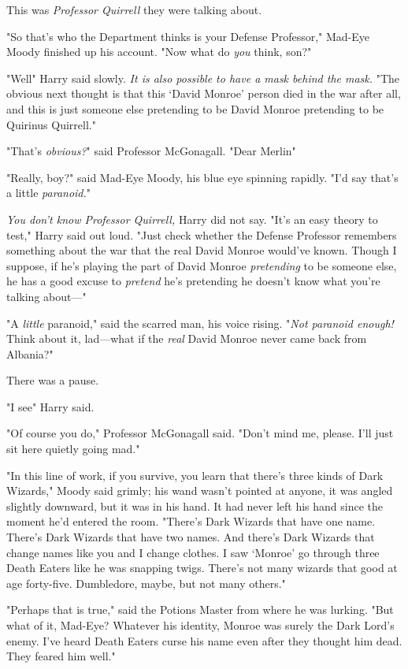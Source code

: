 This was \emph{Professor Quirrell} they were talking about.

"So that's who the Department thinks is your Defense Professor," Mad-Eye Moody
finished up his account. "Now what do \emph{you} think, son?"

"Well{\el}" Harry said slowly. \emph{It is also possible to have a mask
behind the mask.} "The obvious next thought is that this `David Monroe' person
died in the war after all, and this is just someone else pretending to be David
Monroe pretending to be Quirinus Quirrell."

"That's \emph{obvious?}" said Professor McGonagall. "Dear Merlin{\el}"

"Really, boy?" said Mad-Eye Moody, his blue eye spinning rapidly. "I'd say
that's a little{\el} \emph{paranoid.}"

\emph{You don't know Professor Quirrell,} Harry did not say. "It's an easy
theory to test," Harry said out loud. "Just check whether the Defense Professor
remembers something about the war that the real David Monroe would've known.
Though I suppose, if he's playing the part of David Monroe \emph{pretending} to
be someone else, he has a good excuse to \emph{pretend} he's pretending he
doesn't know what you're talking about\mbox{---}"

"A \emph{little} paranoid," said the scarred man, his voice rising. "\emph{Not
paranoid enough! } Think about it, lad---what if the
\emph{real} David Monroe never came back from Albania?"

There was a pause.

"I see{\el}" Harry said.

"Of course you do," Professor McGonagall said. "Don't mind me, please. I'll
just sit here quietly going mad."

"In this line of work, if you survive, you learn that there's three kinds of
Dark Wizards," Moody said grimly; his wand wasn't pointed at anyone, it was
angled slightly downward, but it was in his hand. It had never left his hand
since the moment he'd entered the room. "There's Dark Wizards that have one
name. There's Dark Wizards that have two names. And there's Dark Wizards that
change names like you and I change clothes. I saw `Monroe' go through three
Death Eaters like he was snapping twigs. There's not many wizards that good at
age forty-five. Dumbledore, maybe, but not many others."

"Perhaps that is true," said the Potions Master from where he was lurking. "But
what of it, Mad-Eye? Whatever his identity, Monroe was surely the Dark Lord's
enemy. I've heard Death Eaters curse his name even after they thought him dead.
They feared him well."

